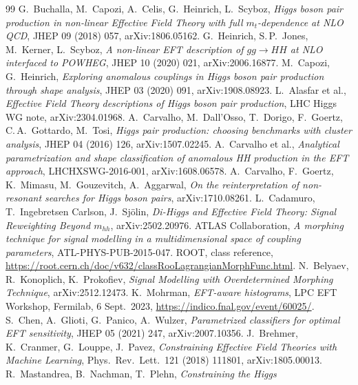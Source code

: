 \begin{thebibliography}{99}\small
{} G.~Buchalla, M.~Capozi, A.~Celis, G.~Heinrich, L.~Scyboz,
  \emph{Higgs boson pair production in non-linear Effective Field Theory with full
  $m_t$-dependence at NLO QCD}, JHEP 09 (2018) 057, arXiv:1806.05162.
 G.~Heinrich, S.\,P.~Jones, M.~Kerner, L.~Scyboz,
  \emph{A non-linear EFT description of $gg\to HH$ at NLO interfaced to POWHEG},
  JHEP 10 (2020) 021, arXiv:2006.16877.
 M.~Capozi, G.~Heinrich, \emph{Exploring anomalous couplings in Higgs
  boson pair production through shape analysis}, JHEP 03 (2020) 091, arXiv:1908.08923.
 L.~Alasfar et al., \emph{Effective Field Theory descriptions of Higgs
  boson pair production}, LHC Higgs WG note, arXiv:2304.01968.
 A.~Carvalho, M.~Dall'Osso, T.~Dorigo, F.~Goertz, C.\,A.~Gottardo,
  M.~Tosi, \emph{Higgs pair production: choosing benchmarks with cluster analysis},
  JHEP 04 (2016) 126, arXiv:1507.02245.
 A.~Carvalho et al., \emph{Analytical parametrization and shape
  classification of anomalous HH production in the EFT approach}, LHCHXSWG-2016-001,
  arXiv:1608.06578.
 A.~Carvalho, F.~Goertz, K.~Mimasu, M.~Gouzevitch, A.~Aggarwal,
  \emph{On the reinterpretation of non-resonant searches for Higgs boson pairs},
  arXiv:1710.08261.
 L.~Cadamuro, T.~Ingebretsen Carlson, J.~Sj\"olin,
  \emph{Di-Higgs and Effective Field Theory: Signal Reweighting Beyond $m_{hh}$},
  arXiv:2502.20976.
 ATLAS Collaboration, \emph{A morphing technique for signal modelling in a
  multidimensional space of coupling parameters}, ATL-PHYS-PUB-2015-047.
 ROOT,  class reference,
  \url{https://root.cern.ch/doc/v632/classRooLagrangianMorphFunc.html}.
 N.~Belyaev, R.~Konoplich, K.~Prokofiev, \emph{Signal Modelling with
  Overdetermined Morphing Technique}, arXiv:2512.12473.
 K.~Mohrman, \emph{EFT-aware histograms}, LPC EFT Workshop, Fermilab,
  6 Sept.\ 2023, \url{https://indico.fnal.gov/event/60025/}.
 S.~Chen, A.~Glioti, G.~Panico, A.~Wulzer, \emph{Parametrized classifiers
  for optimal EFT sensitivity}, JHEP 05 (2021) 247, arXiv:2007.10356.
 J.~Brehmer, K.~Cranmer, G.~Louppe, J.~Pavez, \emph{Constraining
  Effective Field Theories with Machine Learning}, Phys.\ Rev.\ Lett.\ 121 (2018) 111801,
  arXiv:1805.00013.
 R.~Mastandrea, B.~Nachman, T.~Plehn, \emph{Constraining the Higgs
}
\end{thebibliography}
